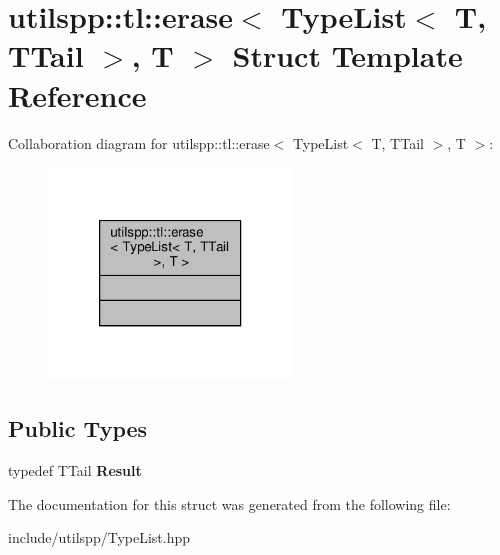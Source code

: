 \hypertarget{structutilspp_1_1tl_1_1erase_3_01TypeList_3_01T_00_01TTail_01_4_00_01T_01_4}{\section{utilspp\-:\-:tl\-:\-:erase$<$ Type\-List$<$ T, T\-Tail $>$, T $>$ Struct Template Reference}
\label{structutilspp_1_1tl_1_1erase_3_01TypeList_3_01T_00_01TTail_01_4_00_01T_01_4}
}


Collaboration diagram for utilspp\-:\-:tl\-:\-:erase$<$ Type\-List$<$ T, T\-Tail $>$, T $>$\-:\nopagebreak
\begin{figure}[H]
\begin{center}
\leavevmode
\includegraphics[width=184pt]{structutilspp_1_1tl_1_1erase_3_01TypeList_3_01T_00_01TTail_01_4_00_01T_01_4__coll__graph}
\end{center}
\end{figure}
\subsection*{Public Types}
\begin{DoxyCompactItemize}
\item 
\hypertarget{structutilspp_1_1tl_1_1erase_3_01TypeList_3_01T_00_01TTail_01_4_00_01T_01_4_af3a261a3a865799a2b34bb7521d350c6}{typedef T\-Tail {\bfseries Result}}\label{structutilspp_1_1tl_1_1erase_3_01TypeList_3_01T_00_01TTail_01_4_00_01T_01_4_af3a261a3a865799a2b34bb7521d350c6}

\end{DoxyCompactItemize}


The documentation for this struct was generated from the following file\-:\begin{DoxyCompactItemize}
\item 
include/utilspp/Type\-List.\-hpp\end{DoxyCompactItemize}
